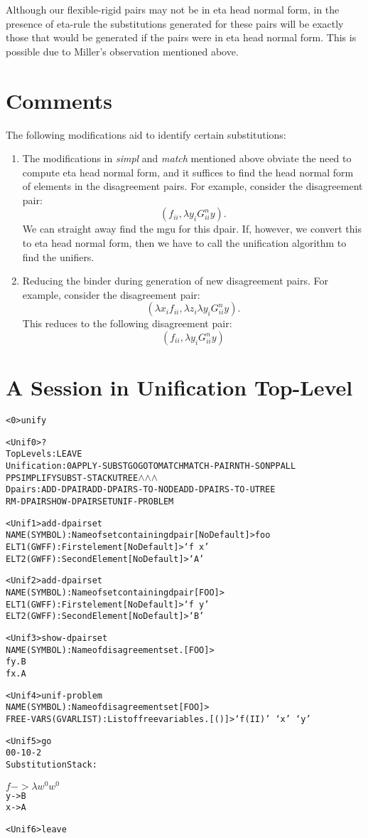 Although our flexible-rigid pairs may not be in eta head normal form,
in the presence of eta-rule
the substitutions generated for these pairs will be exactly those that
would be generated if the pairs were in eta head normal form. This is possible
due to Miller's observation mentioned above.

\section{Comments}
The following modifications aid to identify certain substitutions:

\begin{enumerate}
\item The modifications in {\it simpl} and {\it match} mentioned above
obviate the need to compute eta head normal form, and it suffices to find
the head normal form of elements in the disagreement pairs.
For example, consider the disagreement pair:
$$ (f_{{ii}} , \lambda y_{{i}}  G_{{ii}}^{{n}}  y).$$ 
We can straight away
find the mgu for this dpair. If, however, we convert this to eta head normal
form, then we have to call the unification algorithm to find the unifiers.

\item Reducing the binder during generation of new disagreement pairs. For example,
consider the disagreement pair:
$$(\lambda x_{{i}} f_{{ii}}  , \lambda z_{{i}}\lambda y_{{i}}  G_{{ii}}^{{n}}  y).$$
This reduces to the following disagreement pair:
$$(f_{{ii}}  ,  \lambda y_{{i}}  G_{{ii}}^{{n}}  y)$$
\end{enumerate}

\section{A Session in Unification Top-Level}
\begin{alltt}
<0>{\tt unify}

<Unif0>{\tt ?}
Top Levels:    LEAVE
Unification:   0 APPLY-SUBST GO GOTO MATCH MATCH-PAIR NTH-SON P PALL
               PP SIMPLIFY SUBST-STACK UTREE \(\wedge\) \(\wedge\)\(\wedge\)
Dpairs:        ADD-DPAIR ADD-DPAIRS-TO-NODE ADD-DPAIRS-TO-UTREE
               RM-DPAIR SHOW-DPAIRSET UNIF-PROBLEM

<Unif1>{\tt add-dpairset}
NAME (SYMBOL): Name of set containing dpair [No Default]>{\tt foo}
ELT1 (GWFF): First element [No Default]>{\tt `f x'}
ELT2 (GWFF): Second Element [No Default]>{\tt `A'}

<Unif2>{\tt add-dpairset}
NAME (SYMBOL): Name of set containing dpair [FOO]>
ELT1 (GWFF): First element [No Default]>{\tt `f y'}
ELT2 (GWFF): Second Element [No Default]>{\tt `B'}

<Unif3>{\tt show-dpairset}
NAME (SYMBOL): Name of disagreement set. [FOO]>
f y  .  B
f x  .  A

<Unif4>{\tt unif-problem}
NAME (SYMBOL): Name of disagreement set [FOO]>
FREE-VARS (GVARLIST): List of free variables. [()]>{\tt `f(II)' `x' `y'}

<Unif5>{\tt go}
0  0-1  0-2
Substitution Stack:

\(f   ->    \lambda w^{{0}}  w^{{0}}\)
y   ->   B
x   ->   A

<Unif6> {\tt leave}
\end{alltt}
